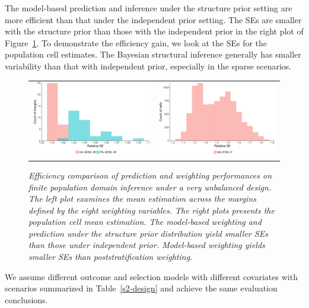 \documentclass[11pt]{article}
\begin{document}
The model-based prediction and inference under the structure prior setting are more efficient than that under the independent prior setting. The SEs are smaller with the structure prior than those with the independent prior in the right plot of Figure~\ref{sim2-se}. To  demonstrate the efficiency gain, we look at the SEs for the population cell estimates. The Bayesian structural inference generally has smaller variability than that with independent prior, especially in the sparse scenarios.
  

 \begin{figure}
\centering
\begin{tabular}{cc}
\includegraphics[width=.475\textwidth]{plot/var8_w_se_case2.pdf}&
\includegraphics[width=.475\textwidth]{plot/var8_p_se_case2.pdf}\\
\end{tabular}
\caption{\em Efficiency comparison of prediction and weighting performances on finite population domain inference under a very unbalanced design. The left plot examines the mean estimation across the margins defined by the eight weighting variables. The right plots presents the population cell mean estimation. The model-based weighting and prediction under the structure prior distribution yield smaller SEs than those under independent prior. Model-based weighting yields smaller SEs than poststratification weighting.}
\label{sim2-se}
\end{figure} 


We assume different outcome and selection models with different covariates with scenarios summarized in Table~\ref{s2-design} and achieve the same evaluation conclusions. 

\end{document}

